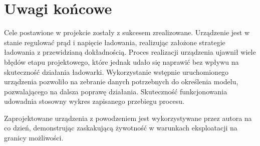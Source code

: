 \documentclass[polish,engineer]{polsl-msth}
\begin{document}
\chapter{Uwagi końcowe}
Cele postawione w projekcie zostały z sukcesem zrealizowane. Urządzenie jest w stanie regulować prąd i napięcie ładowania, realizując założone strategie ładowania z przewidzianą dokładnością. Proces realizacji urządzenia ujawnił wiele błędów etapu projektowego, które jednak udało się naprawić bez wpływu na skuteczność działania ładowarki. Wykorzystanie wstępnie uruchomionego urządzenia pozwoliło na zebranie danych potrzebnych do określenia modelu, pozwalającego na dalsza poprawę działania. Skuteczność funkcjonowania udowadnia stosowny wykres zapisanego przebiegu procesu.

Zaprojektowane urządzenia z powodzeniem jest wykorzystywane przez autora na co dzień, demonstrując zaskakującą żywotność w warunkach eksploatacji na granicy możliwości.


 

\end{document}
